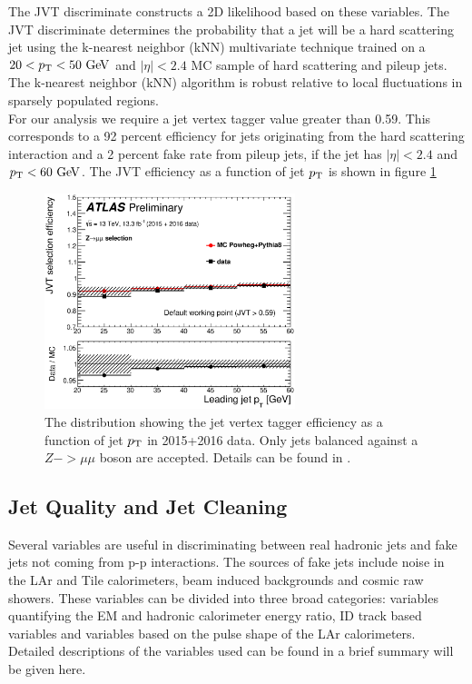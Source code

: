 \indent The JVT discriminate constructs a 2D likelihood based on these variables.   The JVT discriminate determines the probability that a jet will be a hard scattering jet using the k-nearest neighbor (kNN) multivariate technique \cite{TMVA} trained on a $20<\pt<50 \gev$ and $|\eta|<2.4$ MC sample of hard scattering and pileup jets.  The k-nearest neighbor (kNN) algorithm is robust relative to local fluctuations in sparsely populated regions.  \\

\indent For our analysis we require a jet vertex tagger value greater than 0.59.  This corresponds to a 92 percent efficiency for jets originating from the hard scattering interaction and a 2 percent fake rate from pileup jets, if the jet has $|\eta| < 2.4$ and $\pt < 60 \gev$.  The JVT efficiency as a function of jet $p_{\mathrm{T}}$ is shown in figure \ref{fig:JVT_eff} \\

\begin{figure}[htb]
  \begin{center}
    \includegraphics[width=0.65\textwidth]{figures/JetCalib/JVT_eff.eps}\hspace{0.05\textwidth}
\end{center}
\caption{The distribution showing the jet vertex tagger efficiency as a function of jet $p_{\mathrm{T}}$ in 2015+2016 data. Only jets balanced against a $Z->\mu\mu$ boson are accepted.  Details can be found in \cite{JVT}. }
\label{fig:JVT_eff} 
\end{figure}

\subsection{Jet Quality and Jet Cleaning}
\label{sec:jet:quality}

\indent Several variables are useful in discriminating between real hadronic jets and fake jets not coming from p-p interactions.  The sources of fake jets include noise in the LAr and Tile calorimeters, beam induced backgrounds and cosmic raw showers.  These variables can be divided into three broad categories: variables quantifying the EM and hadronic calorimeter energy ratio, ID track based variables and variables based on the pulse shape of the LAr calorimeters.  Detailed descriptions of the variables used can be found in \cite{JetCleaning} a brief summary will be given here.\\

